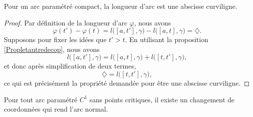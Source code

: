 \begin{lemma}
    Pour un arc paramétré compact, la longueur d'arc est une abscisse curviligne.
\end{lemma}

\begin{proof}
    Par définition de la longueur d'arc $\varphi$, nous avons
    \begin{equation}
        \varphi(t')-\varphi(t)=l\big( [a,t'],\gamma \big)-l\big( [a,t],\gamma \big)=\diamondsuit.
    \end{equation}
    Supposons pour fixer les idées que $t'>t$. En utilisant la proposition \ref{Propletautredecop}, nous avons
    \begin{equation}
        l\big( [a,t'],\gamma \big)=l\big( [a,t],\gamma \big)+l\big( [t,t'],\gamma \big),
    \end{equation}
    et donc après simplification de deux termes,
    \begin{equation}
        \diamondsuit=l\big( [t,t'],\gamma \big),
    \end{equation}
    ce qui est précisément la propriété demandée pour être une abscisse curviligne.
\end{proof}

\begin{proposition}     \label{PropExisteChmNorm}
    Pour tout arc paramétré $C^1$ sans points critiques, il existe un changement de coordonnées qui rend l'arc normal.
\end{proposition}

